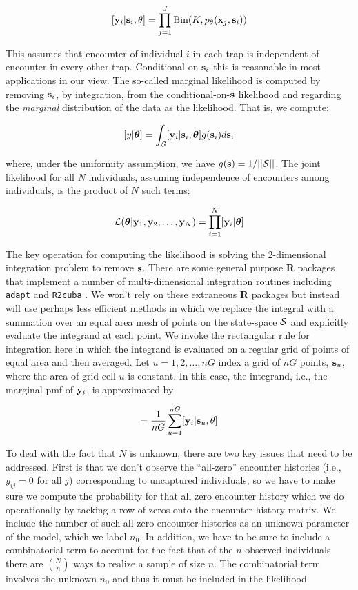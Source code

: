 \documentclass[12pt]{article}
\begin{document}
\begin{spacing}{1.8}
\[
  [{\bf y}_{i} | {\bf s}_{i} , \theta] =
  \prod_{j=1}^{J} \mbox{Bin}(K, p_{\theta}({\bf x}_{j},{\bf s}_{i}) )
\]

{\flushleft This} assumes that encounter of individual $i$ in each
trap is independent of encounter in every other trap. Conditional on
${\bf s}_{i}$ this is reasonable in most applications in our view.
 The so-called marginal likelihood is computed by removing
${\bf s}_{i}$, by integration,  from the conditional-on-${\bf s}$
likelihood and regarding the {\it marginal} distribution of the data
as the likelihood. That
is, we compute:

\[
  [y|{\bm \theta}] =
\int_{{\cal S}}  [ {\bf y}_{i} |{\bf s}_{i},{\bm \theta}] g({\bf s}_{i}) d{\bf s}_{i}
\]

{\flushleft where}, under the uniformity assumption, we have
$g({\bf s}) = 1/||{\cal S}||$.
The joint likelihood for all $N$ individuals, assuming independence of
encounters among individuals, is the product of $N$ such terms:

\[
{\cal L}({\bm \theta} | {\bf y}_{1},{\bf y}_{2},\ldots, {\bf y}_{N}) = \prod_{i=1}^{N}
[{\bf y}_{i}|{\bm \theta}]
\]

The key operation for computing the likelihood is solving the
2-dimensional integration problem to remove ${\bf s}$. There are some
general purpose {\bf R} packages that implement a number of
multi-dimensional integration routines including \mbox{\tt adapt}
\citep{genz_etal:2007} and \mbox{\tt R2cuba} \citep{hahn_etal:2011}.
We won't rely on these extraneous {\bf R} packages but instead will
use perhaps less efficient methods in which we replace the integral
with a summation over an equal area mesh of points on the state-space
${\cal S}$ and explicitly evaluate the integrand at each point. We
invoke the rectangular rule for integration here in which the
integrand is evaluated on a regular grid of points of equal area and
then averaged.  Let $u=1,2,\ldots,nG$ index a grid of $nG$ points,
${\bf s}_{u}$, where the area of grid cell $u$ is constant.  In this
case, the integrand, i.e., the marginal pmf of ${\bf y}_{i}$, is
approximated by

\begin{equation}
         [{\bf y}_{i}|\theta] = \frac{1}{nG} \sum_{u=1}^{nG}  [ {\bf
            y}_{i} |{\bf s}_u, \theta]
\label{mle.eq.intlik}
\end{equation}

To deal with the fact that $N$ is unknown, there are two key issues
that need to be addressed.  First is that we don't observe the
``all-zero'' encounter histories (i.e., $y_{ij} = 0$ for all $j$)
corresponding to uncaptured individuals, so we have to make sure we
compute the probability for that all zero encounter history which we
do operationally by tacking a row of zeros onto the encounter history
matrix. We include the number of such all-zero encounter histories as
an unknown parameter of the model, which we label $n_{0}$.  In
addition, we have to be sure to include a combinatorial term to
account for the fact that of the $n$ observed individuals there are
${N \choose n}$ ways to realize a sample of size $n$. The
combinatorial term involves the unknown $n_{0}$ and thus it must be
included in the likelihood.


\end{spacing}
\end{document}
